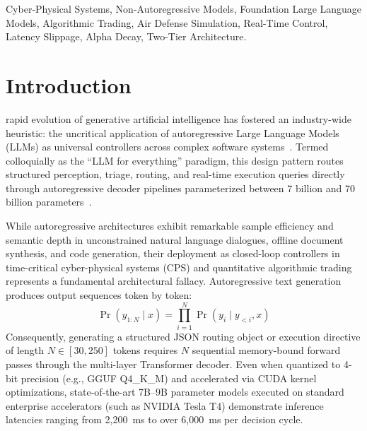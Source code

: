 \documentclass[journal,compsoc]{IEEEtran}
\begin{document}
{\begin{IEEEkeywords}
Cyber-Physical Systems, Non-Autoregressive Models, Foundation Large Language Models, Algorithmic Trading, Air Defense Simulation, Real-Time Control, Latency Slippage, Alpha Decay, Two-Tier Architecture.
\end{IEEEkeywords}}

\maketitle
\IEEEdisplaynontitleabstractindextext
\IEEEpeerreviewmaketitle

\section{Introduction}
 rapid evolution of generative artificial intelligence has fostered an industry-wide heuristic: the uncritical application of autoregressive Large Language Models (LLMs) as universal controllers across complex software systems~\cite{achiam2023gpt4}. Termed colloquially as the ``LLM for everything'' paradigm, this design pattern routes structured perception, triage, routing, and real-time execution queries directly through autoregressive decoder pipelines parameterized between 7 billion and 70 billion parameters~\cite{touvron2023llama}.

While autoregressive architectures exhibit remarkable sample efficiency and semantic depth in unconstrained natural language dialogues, offline document synthesis, and code generation, their deployment as closed-loop controllers in time-critical cyber-physical systems (CPS) and quantitative algorithmic trading represents a fundamental architectural fallacy. Autoregressive text generation produces output sequences token by token:
\begin{equation}
\Pr(y_{1:N} \mid x) = \prod_{i=1}^{N} \Pr(y_i \mid y_{<i}, x)
\end{equation}
Consequently, generating a structured JSON routing object or execution directive of length $N \in [30, 250]$ tokens requires $N$ sequential memory-bound forward passes through the multi-layer Transformer decoder. Even when quantized to 4-bit precision (e.g., GGUF Q4\_K\_M) and accelerated via CUDA kernel optimizations, state-of-the-art 7B--9B parameter models executed on standard enterprise accelerators (such as NVIDIA Tesla T4) demonstrate inference latencies ranging from 2,200~ms to over 6,000~ms per decision cycle.
\end{document}
